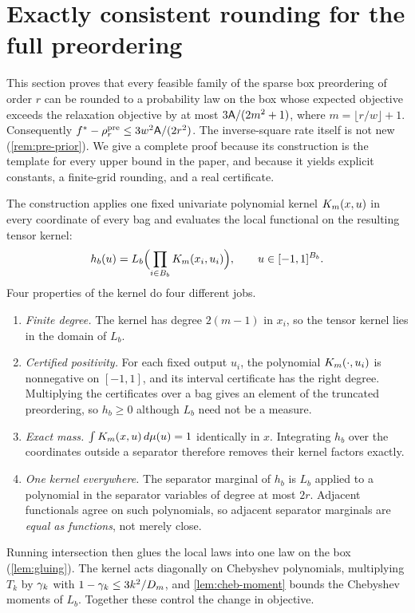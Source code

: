 \section{Exactly consistent rounding for the full preordering}\label{sec:kernels}

This section proves that every feasible family of the sparse box preordering
of order $r$ can be rounded to a probability law on the box whose expected
objective exceeds the relaxation objective by at most $3\mathsf{A}/(2m^2+1)$,
where $m=\lfloor r/w\rfloor+1$. Consequently
$f^{*}-\rho^{\mathrm{pre}}_r\le3w^2\mathsf{A}/(2r^2)$. The inverse-square rate itself is not
new (\cref{rem:pre-prior}). We give a complete proof because its construction
is the template for every upper bound in the paper, and because it yields
explicit constants, a finite-grid rounding, and a real certificate.

The construction applies one fixed univariate polynomial kernel $K_m(x,u)$
in every coordinate of every bag and evaluates the local functional on the
resulting tensor kernel:
\[
  h_b(u)=L_b\Bigl(\prod_{i\in B_b}K_m(x_i,u_i)\Bigr),
  \qquad u\in[-1,1]^{B_b}.
\]
Four properties of the kernel do four different jobs.
\begin{enumerate}[label=(\arabic*)]
\item \emph{Finite degree.} The kernel has degree $2(m-1)$ in $x_i$, so
  the tensor kernel lies in the domain of $L_b$.
\item \emph{Certified positivity.} For each fixed output $u_i$, the
  polynomial $K_m(\cdot,u_i)$ is nonnegative on $[-1,1]$, and its interval
  certificate has the right degree. Multiplying the certificates over a bag
  gives an element of the truncated preordering, so $h_b\ge0$ although $L_b$
  need not be a measure.
\item \emph{Exact mass.} $\int K_m(x,u)\,d\mu(u)=1$ identically in $x$.
  Integrating $h_b$ over the coordinates outside a separator therefore
  removes their kernel factors exactly.
\item \emph{One kernel everywhere.} The separator marginal of $h_b$ is
  $L_b$ applied to a polynomial in the separator variables of degree at
  most $2r$. Adjacent functionals agree on such polynomials, so adjacent
  separator marginals are \emph{equal as functions}, not merely close.
\end{enumerate}
Running intersection then glues the local laws into one law on the box
(\cref{lem:gluing}). The kernel acts diagonally on Chebyshev polynomials,
multiplying $T_k$ by $\gamma_k$ with $1-\gamma_k\le3k^2/D_m$, and
\cref{lem:cheb-moment} bounds the Chebyshev moments of $L_b$. Together these
control the change in objective.

